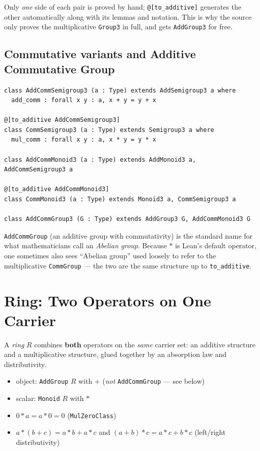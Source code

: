 \documentclass[11pt]{article}
\begin{document}
\begin{takeaway}
Only \emph{one} side of each pair is proved by hand; \verb|@[to_additive]| generates the other automatically along with its lemmas and notation. This is why the source only proves the multiplicative \texttt{Group3} in full, and gets \texttt{AddGroup3} for free.
\end{takeaway}

\subsection{Commutative variants and Additive Commutative Group}

\begin{lstlisting}
class AddCommSemigroup3 (a : Type) extends AddSemigroup3 a where
  add_comm : forall x y : a, x + y = y + x

@[to_additive AddCommSemigroup3]
class CommSemigroup3 (a : Type) extends Semigroup3 a where
  mul_comm : forall x y : a, x * y = y * x

class AddCommMonoid3 (a : Type) extends AddMonoid3 a, AddCommSemigroup3 a

@[to_additive AddCommMonoid3]
class CommMonoid3 (a : Type) extends Monoid3 a, CommSemigroup3 a

class AddCommGroup3 (G : Type) extends AddGroup3 G, AddCommMonoid3 G
\end{lstlisting}

\texttt{AddCommGroup} (an additive group with commutativity) is the standard name for what mathematicians call an \emph{Abelian group}. Because $*$ is Lean's default operator, one sometimes also sees ``Abelian group'' used loosely to refer to the multiplicative \texttt{CommGroup} --- the two are the same structure up to \texttt{to\_additive}.

\section{Ring: Two Operators on One Carrier}

A \emph{ring} $R$ combines \textbf{both} operators on the \emph{same} carrier set: an additive structure and a multiplicative structure, glued together by an absorption law and distributivity.

\begin{itemize}[leftmargin=1.4em,itemsep=1pt]
  \item object: \texttt{AddGroup} $R$ with $+$ \quad (\emph{not} \texttt{AddCommGroup} --- see below)
  \item scalar: \texttt{Monoid} $R$ with $*$
  \item $0 * a = a * 0 = 0$ \hfill (\texttt{MulZeroClass})
  \item $a*(b+c) = a*b + a*c$ and $(a+b)*c = a*c + b*c$ \hfill (left/right distributivity)
\end{itemize}
\end{document}
